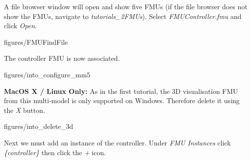 \documentclass[11pt,a4paper]{../tutorial}
\begin{document}
\begin{instructions}
\item A file browser window will open and show five FMUs (if the file browser does not show the FMUs, navigate to \emph{tutorials\_2\pathsep{}FMUs}). Select \emph{FMUController.fmu} and click \emph{Open}.

%
%

    \begin{annotation}[width=0.8\linewidth]{figures/FMUFindFile}
    \end{annotation}

\newpage
\item The controller FMU is now associated.

    \begin{annotation}[width=0.8\linewidth]{figures/into_configure_mm5}
    \end{annotation}

\item \textbf{MacOS X / Linux Only:} As in the first tutorial, the 3D visualisation FMU from this multi-model is only supported on Windows. Therefore delete it using the \emph{X} button.

    \begin{annotation}[width=0.8\linewidth,trim=0 0 0 0,clip]{figures/into_delete_3d}
    \end{annotation}

\newpage
\item Next we must add an instance of the controller. Under \emph{FMU Instances} click \emph{\{controller\}} then click the \emph{+} icon.


\end{instructions}
\end{document}
